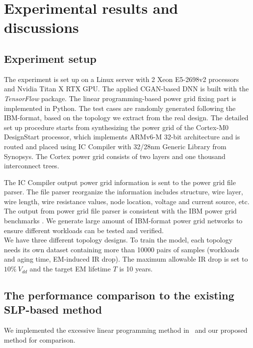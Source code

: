 \section{Experimental results and discussions}
\label{sec:results}
\subsection{Experiment setup}
The experiment is set up on a Linux server with 2 Xeon E5-2698v2
processors and Nvidia Titan X RTX GPU. The applied CGAN-based DNN
is built with the {\it TensorFlow} package. The linear
programming-based power grid fixing part is implemented in Python. The
test cases are randomly generated following the IBM-format, based on
the topology we extract from the real design. The detailed set up procedure
starts from synthesizing the power grid of the Cortex-M0 DesignStart 
processor, which implements ARMv6-M 32-bit architecture and is routed and placed
using IC Compiler with 32/28nm Generic Library from Synopsys. The Cortex power grid
consists of two layers and one thousand interconnect trees.

The IC Compiler output power grid information is sent to the power grid file parser.
The file parser reorganize the information includes structure, wire layer, wire length, 
wire resistance values, node location, voltage and current source, etc. The output from power grid
file parser is consistent with the IBM power grid benchmarks \cite{Nassif:ASPDAC'08}. We generate 
large amount of IBM-format power grid networks to ensure different workloads can be tested and verified.\\

We have three different topology designs. To train the model, each topology needs its own dataset containing more than 10000 pairs of samples  (workloads and aging time, EM-induced IR drop). The maximum allowable IR drop is set to $10\% \ V_{dd}$ and the target EM lifetime $T$ is 10 years. 







\subsection{The performance comparison to the existing SLP-based method}
We implemented the excessive linear programming method in~\cite{Sukharev:2019pg} and our proposed method for comparison. 

